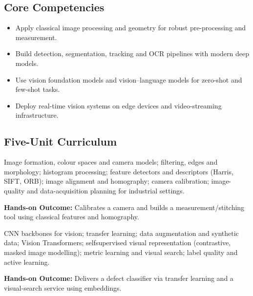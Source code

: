 \documentclass[10pt,a4paper]{article}
\begin{document}
\subsection*{Core Competencies}\begin{itemize}\small
\item Apply classical image processing and geometry for robust pre-processing and measurement.
\item Build detection, segmentation, tracking and OCR pipelines with modern deep models.
\item Use vision foundation models and vision–language models for zero-shot and few-shot tasks.
\item Deploy real-time vision systems on edge devices and video-streaming infrastructure.
\end{itemize}
\subsection*{Five-Unit Curriculum}
\begin{tcolorbox}[unitbox,title={{\color{gold}UNIT I}\quad Image Formation and Classical Vision\hfill{\color{gold}9 Hours}}]\small Image formation, colour spaces and camera models; filtering, edges and morphology; histogram processing; feature detectors and descriptors (Harris, SIFT, ORB); image alignment and homography; camera calibration; image-quality and data-acquisition planning for industrial settings.\par\vspace{2pt}\par\textbf{Hands-on Outcome:} Calibrates a camera and builds a measurement/stitching tool using classical features and homography.\end{tcolorbox}
\begin{tcolorbox}[unitbox,title={{\color{gold}UNIT II}\quad Deep Image Classification and Representation\hfill{\color{gold}9 Hours}}]\small CNN backbones for vision; transfer learning; data augmentation and synthetic data; Vision Transformers; selfsupervised visual representation (contrastive, masked image modelling); metric learning and visual search; label quality and active learning.\par\vspace{2pt}\par\textbf{Hands-on Outcome:} Delivers a defect classifier via transfer learning and a visual-search service using embeddings.\end{tcolorbox}
\end{document}
